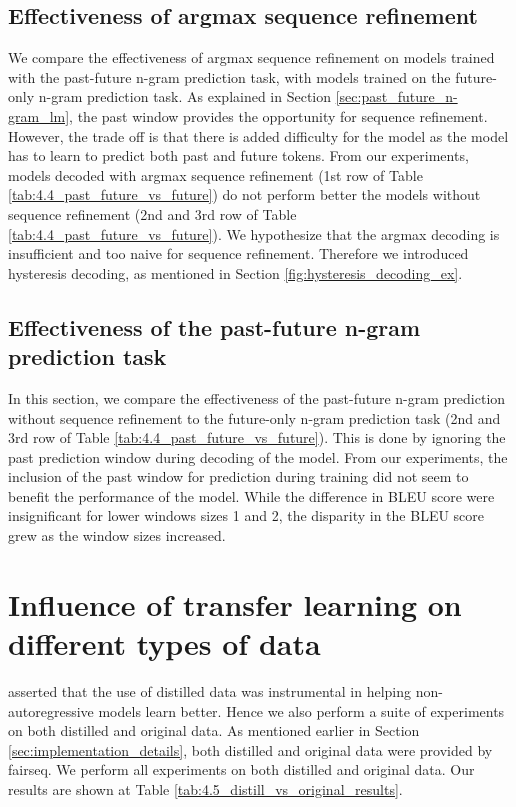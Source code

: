 \subsection{Effectiveness of argmax sequence refinement} \label{subsec:effective_argmax}
We compare the effectiveness of argmax sequence refinement on models trained with the past-future n-gram prediction task, with models trained on the future-only n-gram prediction task. As explained in Section \ref{sec:past_future_n-gram_lm}, the past window provides the opportunity for sequence refinement. However, the trade off is that there is added difficulty for the model as the model has to learn to predict both past and future tokens. From our experiments, models decoded with argmax sequence refinement (1st row of Table \ref{tab:4.4_past_future_vs_future}) do not perform better the models without sequence refinement (2nd and 3rd row of Table \ref{tab:4.4_past_future_vs_future}). We hypothesize that the argmax decoding is insufficient and too naive for sequence refinement. Therefore we introduced hysteresis decoding, as mentioned in Section \ref{fig:hysteresis_decoding_ex}.


\subsection{Effectiveness of the past-future n-gram prediction task}
In this section, we compare the effectiveness of the past-future n-gram prediction without sequence refinement to the future-only n-gram prediction task (2nd and 3rd row of Table \ref{tab:4.4_past_future_vs_future}). This is done by ignoring the past prediction window during decoding of the model. From our experiments, the inclusion of the past window for prediction during training did not seem to benefit the performance of the model. While the difference in BLEU score were insignificant for lower windows sizes 1 and 2, the disparity in the BLEU score grew as the window sizes increased.




\section{Influence of transfer learning on different types of data}
\textcite{gu_non-autoregressive_2018} asserted that the use of distilled data was instrumental in helping non-autoregressive models learn better. Hence we also perform a suite of experiments on both distilled and original data. As mentioned earlier in Section \ref{sec:implementation_details}, both distilled and original data were provided by fairseq. We perform all experiments on both distilled and original data. Our results are shown at Table \ref{tab:4.5_distill_vs_original_results}.


